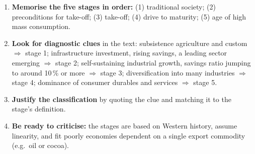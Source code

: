 \documentclass[11pt]{article}
\begin{document}
\begin{methode}
\begin{enumerate}
\item \textbf{Memorise the five stages in order:} (1) traditional society; (2) preconditions for take-off; (3) take-off; (4) drive to maturity; (5) age of high mass consumption.
\item \textbf{Look for diagnostic clues} in the text: subsistence agriculture and custom $\Rightarrow$ stage 1; infrastructure investment, rising savings, a leading sector emerging $\Rightarrow$ stage 2; self-sustaining industrial growth, savings ratio jumping to around 10\,\% or more $\Rightarrow$ stage 3; diversification into many industries $\Rightarrow$ stage 4; dominance of consumer durables and services $\Rightarrow$ stage 5.
\item \textbf{Justify the classification} by quoting the clue and matching it to the stage's definition.
\item \textbf{Be ready to criticise:} the stages are based on Western history, assume linearity, and fit poorly economies dependent on a single export commodity (e.g.\ oil or cocoa).
\end{enumerate}
\end{methode}
\end{document}
